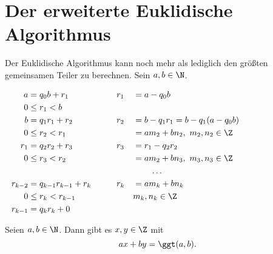 \section*{Der erweiterte Euklidische Algorithmus}

Der Euklidische Algorithmus kann noch mehr als lediglich den größten gemeinsamen Teiler zu berechnen. Sein $a,b \in \N$.

\begin{alignat*}{3}
	a &= q_0 b +r_1 &&\qquad r_1 &&= a - q_0 b\\
	0 &\leq r_1 < b\\
	b &= q_1 r_1 + r_2 &&\qquad r_2 &&= b - q_1 r_1 = b - q_1(a-q_0b)\\
	0 &\leq r_2 < r_1 &&\qquad &&= am_2 + bn_2,\ m_2,n_2 \in \Z\\
	r_1 &= q_2 r_2 + r_3 &&\qquad r_3 &&= r_1 - q_2 r_2\\
	0 &\leq r_3 < r_2 &&\qquad &&= am_2 + bn_3,\ m_3,n_3 \in \Z\\
	\noalign{\centering \dots}
	r_{k-2} &= q_{k-1}r_{k-1} + r_k &&\qquad r_k &&= am_k + bn_k\\
	0 &\leq r_k < r_{k-1} &&\qquad &&m_k,n_k \in \Z\\
	r_{k-1} &= q_k r_k + 0
\end{alignat*}

\begin{thm}\autolabel
	Seien $a,b \in \N$. Dann gibt es \( x,y \in \Z \) mit
	\[ ax + by = \ggt(a,b). \]
\end{thm}